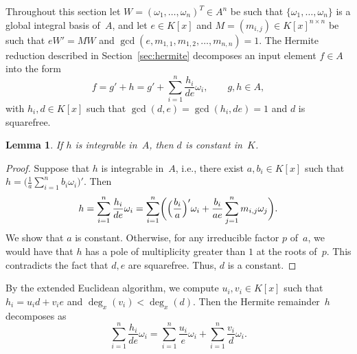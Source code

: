 \documentclass{sig-alternate}
\newtheorem{lemma}[theorem]{Lemma}
\begin{document}
Throughout this section let $W=(\omega_1,\ldots,\omega_n)^T\in A^n$ be such
that $\{\omega_1, \ldots, \omega_n\}$ is a global integral basis of~$A$, and
let $e\in K[x]$ and $M=(m_{i,j})\in K[x]^{n\times n}$ be such that $eW'=MW$
and $\gcd(e, m_{1, 1}, m_{1, 2}, \ldots, m_{n ,n})=1$. The Hermite reduction
described in Section~\ref{sec:hermite} decomposes an input element $f\in A$
into the form
\[
  f = g' + h = g' + \sum_{i=1}^n \frac{h_i}{de} \omega_i,\qquad
  g, h\in A,
\]
with $h_i, d\in K[x]$ such that $\gcd(d, e)=\gcd(h_i,de)=1$ and $d$ is squarefree.
\begin{lemma}\label{LEM:d}
If $h$ is integrable in~$A$, then $d$ is constant in~$K$.
\end{lemma}
\begin{proof}
Suppose that $h$ is integrable in~$A$, i.e., there exist $a, b_i\in K[x]$
such that $h = \bigl(\frac{1}{a}\sum_{i=1}^n b_i \omega_i\bigr)'$. Then
\[
  h = \sum_{i=1}^n \frac{h_i}{de}\omega_i= \sum_{i=1}^n \biggl(\Bigl(\frac{b_i}{a}\Bigr)' \omega_i +
  \frac{b_i}{a e} \sum_{j=1}^n  m_{i, j}\omega_j\biggr).
\]
We show that $a$ is constant. Otherwise, for any irreducible factor $p$ of~$a$, we would have that $h$ has a pole of
multiplicity greater than $1$ at the roots of~$p$. This contradicts
the fact that $d, e$ are squarefree. Thus, $d$ is a constant.
\end{proof}

By the extended Euclidean algorithm, we compute $u_i, v_i\in K[x]$ such that
$h_i = u_i d + v_i e$ and $\deg_x(v_i) < \deg_x(d)$. Then the Hermite remainder~$h$
decomposes as
\begin{equation}\label{EQ:h}
  \sum_{i=1}^n \frac{h_i}{de}\omega_i =  \sum_{i=1}^n \frac{u_i}{e}\omega_i + \sum_{i=1}^n \frac{v_i}{d}\omega_i.
\end{equation}
\end{document}
